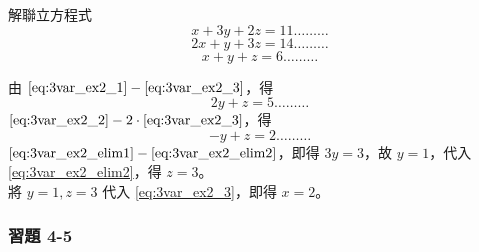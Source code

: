 \begin{example}\label{ex:4-3-7}
解聯立方程式
\begin{equation}\label{eq:3var_ex2_1}
  x+3y+2z = 11 \dots\dots\dots
\end{equation}
\begin{equation}\label{eq:3var_ex2_2}
  2x+y+3z = 14 \dots\dots\dots
\end{equation}
\begin{equation}\label{eq:3var_ex2_3}
  x+y+z = 6 \dots\dots\dots
\end{equation}
\end{example}

\begin{solution*}
由 $\eqref{eq:3var_ex2_1} - \eqref{eq:3var_ex2_3}$，得
\begin{equation}\label{eq:3var_ex2_elim1}
  2y+z = 5 \dots\dots\dots
\end{equation}
$\eqref{eq:3var_ex2_2} - 2 \cdot \eqref{eq:3var_ex2_3}$，得
\begin{equation}\label{eq:3var_ex2_elim2}
  -y+z = 2 \dots\dots\dots
\end{equation}
$\eqref{eq:3var_ex2_elim1} - \eqref{eq:3var_ex2_elim2}$，即得 $3y = 3$，故 $y=1$，代入 \eqref{eq:3var_ex2_elim2}，得 $z=3$。\\
將 $y=1, z=3$ 代入 \eqref{eq:3var_ex2_3}，即得 $x=2$。
\end{solution*}

\subsubsection*{習題 4-5}\label{sec:ex4-5}


